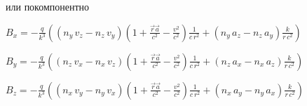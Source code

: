 \documentclass[11pt]{article}
\makeatletter
\newcommand{\boxspacing}{\kern\kvtcb@left@rule\kern\kvtcb@boxsep}
\newcommand{\prompt}[4]{
        {\ttfamily\llap{{\color{#2}[#3]:\hspace{3pt}#4}}\vspace{-\baselineskip}}
    }
\makeatother
\begin{document}
или покомпонентно

\(B_x = -\frac{q}{k^3}\left( \left( n_y\,v_z - n_z\,v_y \right) \left(1 + \frac{\vec{r}\vec{a}}{c^2} - \frac{v^2}{c^2}\right) \frac{1}{c\,r^2} + \left( n_y\,a_z - n_z\,a_y \right) \frac{k}{r\,c^2}\right)\)

\(B_y = -\frac{q}{k^3}\left( \left( n_z\,v_x - n_x\,v_z \right) \left(1 + \frac{\vec{r}\vec{a}}{c^2} - \frac{v^2}{c^2}\right) \frac{1}{c\,r^2} + \left( n_z\,a_x - n_x\,a_z \right) \frac{k}{r\,c^2}\right)\)

\(B_z = -\frac{q}{k^3}\left( \left( n_x\,v_y - n_y\,v_x \right) \left(1 + \frac{\vec{r}\vec{a}}{c^2} - \frac{v^2}{c^2}\right) \frac{1}{c\,r^2} + \left( n_x\,a_y - n_y\,a_x \right) \frac{k}{r\,c^2}\right)\)

    \begin{tcolorbox}[breakable, size=fbox, boxrule=1pt, pad at break*=1mm,colback=cellbackground, colframe=cellborder]
\prompt{In}{incolor}{ }{\boxspacing}
\begin{Verbatim}[commandchars=\\\{\}]

\end{Verbatim}
\end{tcolorbox}


    
    
    
\end{document}
